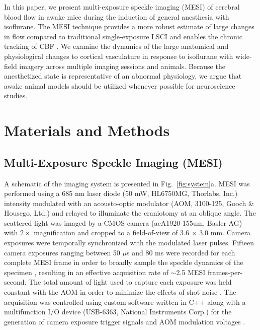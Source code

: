 \documentclass[review]{elsarticle}
\begin{document}
In this paper, we present multi-exposure speckle imaging (MESI) of cerebral blood flow in awake mice during the induction of general anesthesia with isoflurane. The MESI technique \cite{Parthasarathy:2008el} provides a more robust estimate of large changes in flow compared to traditional single-exposure LSCI \cite{Parthasarathy:2010vo} and enables the chronic tracking of CBF \cite{Kazmi:2013hp}. We examine the dynamics of the large anatomical and physiological changes to cortical vasculature in response to isoflurane with wide-field imagery across multiple imaging sessions and animals. Because the anesthetized state is representative of an abnormal physiology, we argue that awake animal models should be utilized whenever possible for neuroscience studies.


\section{Materials and Methods}

\subsection{Multi-Exposure Speckle Imaging (MESI)}
A schematic of the imaging system is presented in Fig.~\ref{fig:system}a. MESI was performed using a 685 nm laser diode (50 mW, HL6750MG, Thorlabs, Inc.) intensity modulated with an acousto-optic modulator (AOM, 3100-125, Gooch \& Housego, Ltd.) and relayed to illuminate the craniotomy at an oblique angle. The scattered light was imaged by a CMOS camera (acA1920-155um, Basler AG) with $2\times$ magnification and cropped to a field-of-view of 3.6 $\times$ 3.0 mm. Camera exposures were temporally synchronized with the modulated laser pulses. Fifteen camera exposures ranging between 50 $\mu$s and 80 ms \cite{Parthasarathy:2008el,Atchia:2013ep,Kazmi:2013hp} were recorded for each complete MESI frame in order to broadly sample the speckle dynamics of the specimen \cite{Kazmi:2014go}, resulting in an effective acquisition rate of $\sim$2.5 MESI frames-per-second. The total amount of light used to capture each exposure was held constant with the AOM in order to minimize the effects of shot noise \cite{Parthasarathy:2008el}. The acquisition was controlled using custom software written in C++ along with a multifunction I/O device (USB-6363, National Instruments Corp.) for the generation of camera exposure trigger signals and AOM modulation voltages \cite{Sullender:2018ff}.
\end{document}
